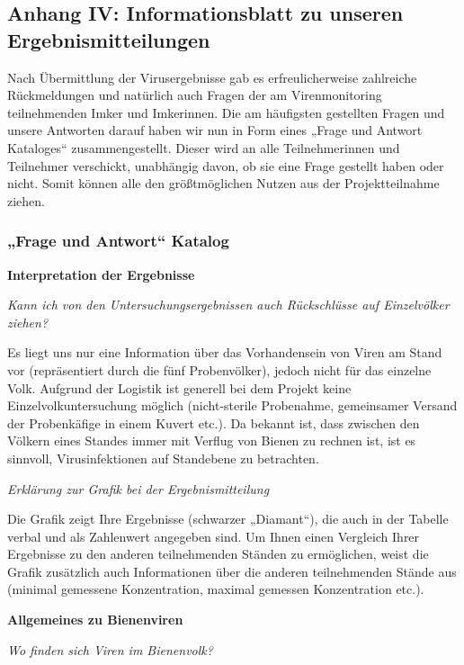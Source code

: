 \subsection{Anhang IV: Informationsblatt zu unseren Ergebnismitteilungen} \label{chap:anhang_FAQ}


Nach Übermittlung der Virusergebnisse gab es erfreulicherweise zahlreiche Rückmeldungen und natürlich auch Fragen der am Virenmonitoring teilnehmenden Imker und Imkerinnen. Die am häufigsten gestellten Fragen und unsere Antworten darauf haben wir nun in Form eines „Frage und Antwort Kataloges“ zusammengestellt. Dieser wird an alle Teilnehmerinnen und Teilnehmer verschickt, unabhängig davon, ob sie eine Frage gestellt haben oder nicht. Somit können alle den größtmöglichen Nutzen aus der Projektteilnahme ziehen.



\subsubsection{„Frage und Antwort“ Katalog}
\textbf{Interpretation der Ergebnisse}

\textit{Kann ich von den Untersuchungsergebnissen auch Rückschlüsse auf Einzelvölker ziehen?}

Es liegt uns nur eine Information über das Vorhandensein von Viren am Stand vor (repräsentiert durch die fünf Probenvölker), jedoch nicht für das einzelne Volk. Aufgrund der Logistik ist generell bei dem Projekt keine Einzelvolkuntersuchung möglich (nicht-sterile Probenahme, gemeinsamer Versand der Probenkäfige in einem Kuvert etc.). Da bekannt ist, dass zwischen den Völkern eines Standes immer mit Verflug von Bienen zu rechnen ist, ist es sinnvoll, Virusinfektionen auf Standebene zu betrachten.


\textit{Erklärung zur Grafik bei der Ergebnismitteilung}

Die Grafik zeigt Ihre Ergebnisse (schwarzer „Diamant“), die auch in der Tabelle verbal und als Zahlenwert angegeben sind. Um Ihnen einen Vergleich Ihrer Ergebnisse zu den anderen teilnehmenden Ständen zu ermöglichen, weist die Grafik zusätzlich auch Informationen über die anderen teilnehmenden Stände aus (minimal gemessene Konzentration, maximal gemessen Konzentration etc.).

\textbf{Allgemeines zu Bienenviren}

\textit{Wo finden sich Viren im Bienenvolk?}

